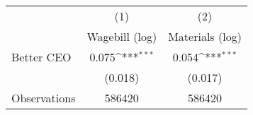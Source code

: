 {
\def\sym#1{\ifmmode^{#1}\else\(^{#1}\)\fi}
\begin{tabular}{l*{2}{c}}
\hline\hline
                    &\multicolumn{1}{c}{(1)}&\multicolumn{1}{c}{(2)}\\
                    &\multicolumn{1}{c}{Wagebill (log)}&\multicolumn{1}{c}{Materials (log)}\\
\hline
Better CEO          &       0.075\sym{***}&       0.054\sym{***}\\
                    &     (0.018)         &     (0.017)         \\
\hline
Observations        &      586420         &      586420         \\
\hline\hline
\end{tabular}
}
